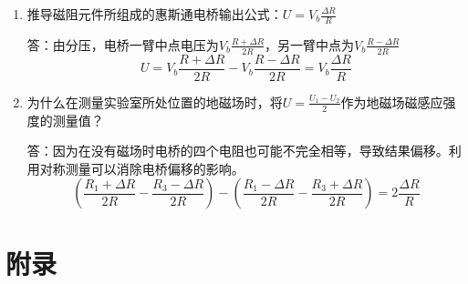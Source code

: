 \documentclass[11pt]{ctexart}
\begin{document}
\begin{enumerate}
\def\labelenumi{\arabic{enumi}.}
\item
  推导磁阻元件所组成的惠斯通电桥输出公式：\(U=V_b \frac{\Delta R}{R}\)

  答：由分压，电桥一臂中点电压为\(V_b \frac{R+\Delta R}{2R}\)，另一臂中点为\(V_b \frac{R-\Delta R}{2R}\)
  \[U=V_b \frac{R+\Delta R}{2R}-V_b \frac{R-\Delta R}{2R}=V_b \frac{\Delta R}{R}\]
\item
  为什么在测量实验室所处位置的地磁场时，将\(U=\frac{U_1-U_2}{2}\)作为地磁场磁感应强度的测量值？

  答：因为在没有磁场时电桥的四个电阻也可能不完全相等，导致结果偏移。利用对称测量可以消除电桥偏移的影响。
  \[(\frac{R_1+\Delta R}{2R}-\frac{R_3-\Delta R}{2R})-(\frac{R_1-\Delta R}{2R}-\frac{R_3+\Delta R}{2R})=2\frac{\Delta R}{R}\]
\end{enumerate}


    
\section{附录}\label{code}
\end{document}
